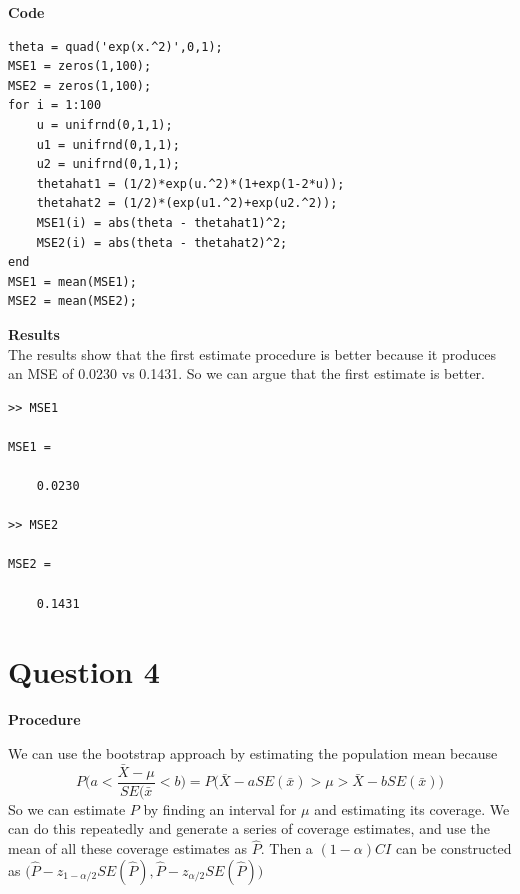 \documentclass[12pt,a4paper]{article}
\begin{document}
\textbf{Code}\\

\begin{verbatim}
theta = quad('exp(x.^2)',0,1);
MSE1 = zeros(1,100);
MSE2 = zeros(1,100);
for i = 1:100
    u = unifrnd(0,1,1);
    u1 = unifrnd(0,1,1);
    u2 = unifrnd(0,1,1);
    thetahat1 = (1/2)*exp(u.^2)*(1+exp(1-2*u));
    thetahat2 = (1/2)*(exp(u1.^2)+exp(u2.^2));
    MSE1(i) = abs(theta - thetahat1)^2;
    MSE2(i) = abs(theta - thetahat2)^2;
end
MSE1 = mean(MSE1);
MSE2 = mean(MSE2);
\end{verbatim}

\textbf{Results}\\
The results show that the first estimate procedure is better because it produces an MSE of 0.0230 vs 0.1431. So we can argue that the first estimate is better. 

\begin{verbatim}
>> MSE1

MSE1 =

    0.0230

>> MSE2

MSE2 =

    0.1431
\end{verbatim}
\clearpage

\section*{Question 4}

\textbf{Procedure}

We can use the bootstrap approach by estimating the population mean because \[P\biggr(a<\dfrac{\bar{X}-\mu}{SE(\bar{x}}<b\biggr)=P\biggr(\bar{X}-aSE(\bar{x})>\mu>\bar{X}-bSE(\bar{x})\biggr)\]
So we can estimate $P$ by finding an interval for $\mu$ and estimating its coverage. We can do this repeatedly and generate a series of coverage estimates, and use the mean of all these coverage estimates as $\hat{P}$. Then a $(1-\alpha)CI$ can be constructed as $\biggr(\hat{P}-z_{1-\alpha/2}SE(\hat{P}),\hat{P}-z_{\alpha/2}SE(\hat{P})\biggr)$
\end{document}
